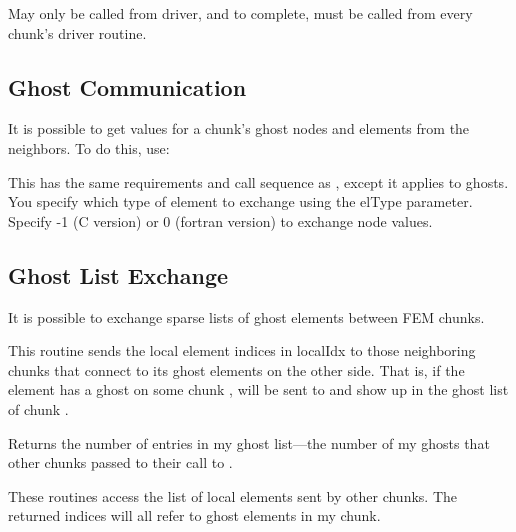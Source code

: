 \documentclass[10pt]{article}
\begin{document}
     May only be called from driver, and to complete, must be called
     from every chunk's driver routine.



\subsection{Ghost Communication}

It is possible to get values for a chunk's ghost nodes and elements from the neighbors. To do this, use:


This has the same requirements and call sequence as , except it applies to ghosts. You specify which type of element to exchange using the elType parameter. Specify -1 (C version) or 0 (fortran version) to exchange node values.  


\subsection{Ghost List Exchange}

It is possible to exchange sparse lists of ghost elements between FEM chunks.


This routine sends the local element indices in localIdx to those neighboring chunks that connect to its ghost elements on the other side.  That is, if the element
 has a ghost on some chunk ,  will be sent to 
and show up in the ghost list of chunk .

Returns the number of entries in my ghost list---the number of my ghosts that
other chunks passed to their call to .


These routines access the list of local elements sent by other chunks.  
The returned indices will all refer to ghost elements in my chunk.



%   



\end{document}
